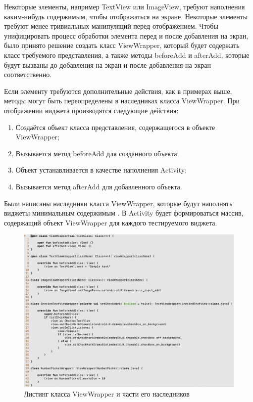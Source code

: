 \documentclass[a4paper,14pt]{extarticle} %
\begin{document}
	Некоторые элементы, например TextView или ImageView, требуют наполнения каким-нибудь содержимым, чтобы отображаться на экране. Некоторые элементы требуют менее тривиальных манипуляций перед отображением. Чтобы унифицировать процесс обработки элемента перед и после добавления на экран, было принято решение создать класс ViewWrapper, который будет содержать класс требуемого представления, а также методы beforeAdd и afterAdd, которые будут вызваны до добавления на экран и после добавления на экран соответственно.
	
	Если элементу требуются дополнительные действия, как в примерах выше, методы могут быть переопределены в наследниках класса ViewWrapper. При отображении виджета производятся следующие действия:
	\begin{enumerate}
		\item Создаётся объект класса представления, содержащегося в объекте ViewWrapper;
		\item Вызывается метод beforeAdd для созданного объекта;
		\item Объект устанавливается в качестве наполнения Activity;
		\item Вызывается метод afterAdd для добавленного объекта.
	\end{enumerate}

	Были написаны наследники класса ViewWrapper, которые будут наполнять виджеты минимальным содержимым \ris{\ref{fig:wrapper}}. В Activity будет формироваться массив, содержащий объект ViewWrapper для каждого тестируемого виджета.
	
	\begin{figure}[tbh]
		\includegraphics[width=\textwidth]{wrapper}
		\caption{Листинг класса ViewWrapper и части его наследников}
		\label{fig:wrapper}
	\end{figure}
	
\end{document}
